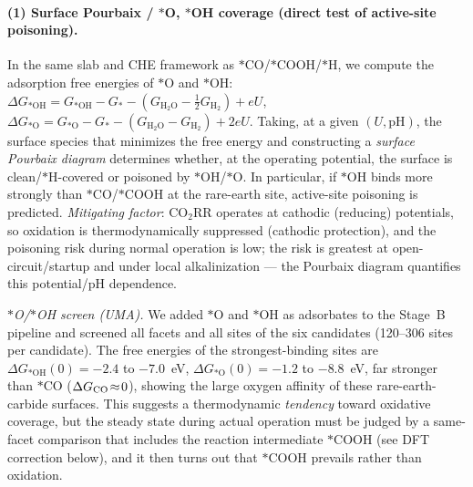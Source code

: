 \documentclass[11pt,a4paper]{report}
\begin{document}
\paragraph{(1) Surface Pourbaix / $*$O, $*$OH coverage (direct test of active-site poisoning).} In the same slab and CHE framework as
$*$CO/$*$COOH/$*$H, we compute the adsorption free energies of $*$O and $*$OH:
$\Delta G_{*\mathrm{OH}}=G_{*\mathrm{OH}}-G_*-(G_{\mathrm{H_2O}}-\tfrac12 G_{\mathrm{H_2}})+eU$,
$\Delta G_{*\mathrm{O}}=G_{*\mathrm{O}}-G_*-(G_{\mathrm{H_2O}}-G_{\mathrm{H_2}})+2eU$.
Taking, at a given $(U,\mathrm{pH})$, the surface species that minimizes the free energy and constructing a \emph{surface Pourbaix diagram}
determines whether, at the operating potential, the surface is clean/$*$H-covered or poisoned by $*$OH/$*$O. In particular, if $*$OH binds
more strongly than $*$CO/$*$COOH at the rare-earth site, active-site poisoning is predicted. \emph{Mitigating factor}:
CO$_2$RR operates at cathodic (reducing) potentials, so oxidation is thermodynamically suppressed (cathodic protection), and the poisoning risk during
normal operation is low; the risk is greatest at open-circuit/startup and under local alkalinization --- the Pourbaix diagram quantifies this
potential/pH dependence.

\emph{$*$O/$*$OH screen (UMA).} We added $*$O and $*$OH as adsorbates to the Stage~B pipeline and screened all facets and all sites of the six candidates
(120--306 sites per candidate). The free energies of the strongest-binding sites are
$\Delta G_{*\mathrm{OH}}(0)=-2.4$ to $-7.0$~eV, $\Delta G_{*\mathrm{O}}(0)=-1.2$ to $-8.8$~eV, far stronger
than $*$CO ($\Delta G_{\rm CO}\!\approx\!0$), showing the large oxygen affinity of these rare-earth-carbide surfaces. This suggests a thermodynamic
\emph{tendency} toward oxidative coverage, but the steady state during actual operation must be judged by a same-facet comparison that includes the reaction intermediate
$*$COOH (see DFT correction below), and it then turns out that $*$COOH prevails rather than oxidation.
\end{document}
